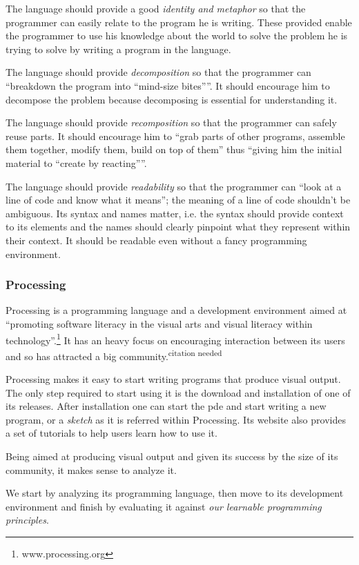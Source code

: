 \documentclass{./llncs2e/llncs}
\begin{document}
The language should provide a good \emph{identity and metaphor} so that the programmer can easily relate to the program he is writing. These provided enable the programmer to use his knowledge about the world to solve the problem he is trying to solve by writing a program in the language. 

The language should provide \emph{decomposition} so that the programmer can ``breakdown the program into ``mind-size bites''''. It should encourage him to decompose the problem because decomposing is essential for understanding it.

The language should provide \emph{recomposition} so that the programmer can safely reuse parts. It should encourage him to ``grab parts of other programs, assemble them together, modify them, build on top of them'' thus ``giving him the initial material to ``create by reacting''''.

The language should provide \emph{readability} so that the programmer can ``look at a line of code and know what it means''; the meaning of a line of code shouldn't be ambiguous. Its syntax and names matter, i.e. the syntax should provide context to its elements and the names should clearly pinpoint what they represent within their context. It should be readable even without a fancy programming environment.

\subsubsection{Processing\cite{reas2007processing}}
Processing is a programming language and a development environment aimed at ``promoting software literacy in the visual arts and visual literacy within technology''.\footnote{www.processing.org} It has an heavy focus on encouraging interaction between its users and so has attracted a big community.\textsuperscript{citation needed}

Processing makes it easy to start writing programs that produce visual output. The only step required to start using it is the download and installation of one of its releases. After installation one can start the \ac{pde} and start writing a new program, or a \emph{sketch} as it is referred within Processing. Its website also provides a set of tutorials to help users learn how to use it.

Being aimed at producing visual output and given its success by the size of its community, it makes sense to analyze it.

We start by analyzing its programming language, then move to its development environment and finish by evaluating it against \emph{our learnable programming principles}.
\end{document}
